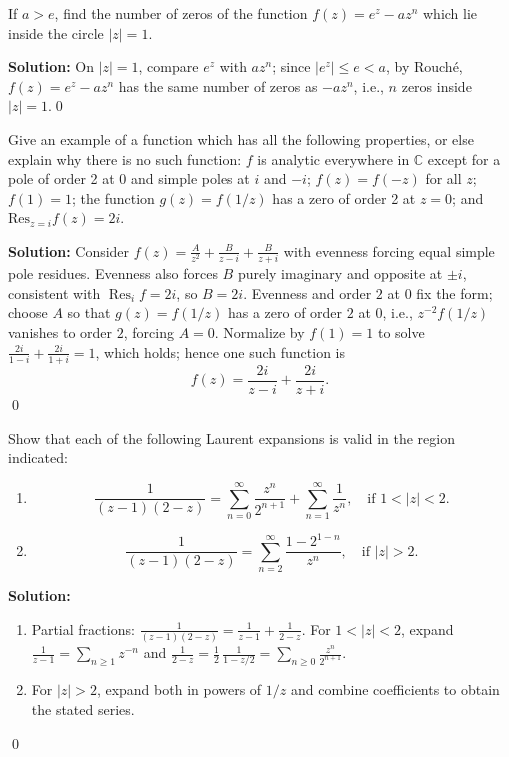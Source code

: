 \begin{problembox}
If \( a > e \), find the number of zeros of the function \( f(z) = e^z - a z^n \) which lie inside the circle \( |z| = 1 \).
\end{problembox}

\bigskip\noindent\textbf{Solution:}
On $|z|=1$, compare $e^z$ with $a z^n$; since $|e^z|\le e< a$, by Rouché, $f(z)=e^z-az^n$ has the same number of zeros as $-az^n$, i.e., $n$ zeros inside $|z|=1$.\qed


\begin{problembox}
Give an example of a function which has all the following properties, or else explain why there is no such function: \( f \) is analytic everywhere in \( \mathbb{C} \) except for a pole of order 2 at 0 and simple poles at \( i \) and \( -i \); \( f(z) = f(-z) \) for all \( z \); \( f(1) = 1 \); the function \( g(z) = f(1/z) \) has a zero of order 2 at \( z = 0 \); and \( \text{Res}_{z=i} f(z) = 2i \).
\end{problembox}

\bigskip\noindent\textbf{Solution:}
Consider $f(z)=\frac{A}{z^2}+\frac{B}{z-i}+\frac{B}{z+i}$ with evenness forcing equal simple pole residues. Evenness also forces $B$ purely imaginary and opposite at $\pm i$, consistent with $\operatorname{Res}_{i}f=2i$, so $B=2i$. Evenness and order $2$ at $0$ fix the form; choose $A$ so that $g(z)=f(1/z)$ has a zero of order $2$ at $0$, i.e., $z^{-2}f(1/z)$ vanishes to order $2$, forcing $A=0$. Normalize by $f(1)=1$ to solve $\frac{2i}{1-i}+\frac{2i}{1+i}=1$, which holds; hence one such function is
\[f(z)=\frac{2i}{z-i}+\frac{2i}{z+i}.
\]\qed


\begin{problembox}
Show that each of the following Laurent expansions is valid in the region indicated:
\begin{enumerate}[label=(\alph*)]
\item \[ \frac{1}{(z - 1)(2 - z)} = \sum_{n=0}^{\infty} \frac{z^n}{2^{n+1}} + \sum_{n=1}^{\infty} \frac{1}{z^n}, \quad \text{if } 1 < |z| < 2. \]
\item \[ \frac{1}{(z - 1)(2 - z)} = \sum_{n=2}^{\infty} \frac{1 - 2^{1-n}}{z^n}, \quad \text{if } |z| > 2. \]
\end{enumerate}
\end{problembox}

\bigskip\noindent\textbf{Solution:}
\begin{enumerate}[label=(\alph*)]
\item Partial fractions: $\frac{1}{(z-1)(2-z)}=\frac{1}{z-1}+\frac{1}{2-z}$. For $1<|z|<2$, expand $\frac{1}{z-1}=\sum_{n\ge1}z^{-n}$ and $\frac{1}{2-z}=\frac{1}{2}\,\frac{1}{1-z/2}=\sum_{n\ge0}\frac{z^n}{2^{n+1}}$.
\item For $|z|>2$, expand both in powers of $1/z$ and combine coefficients to obtain the stated series.
\end{enumerate}\qed


